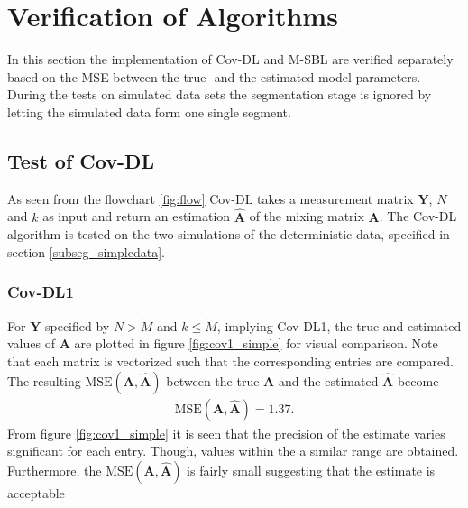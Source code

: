 \section{Verification of Algorithms}
In this section the implementation of Cov-DL and M-SBL are verified separately based on the MSE between the true- and the estimated model parameters.
During the tests on simulated data sets the segmentation stage is ignored by letting the simulated data form one single segment.    

\subsection{Test of Cov-DL}
As seen from the flowchart \ref{fig:flow} Cov-DL takes a measurement matrix $\mathbf{Y}$, $N$ and $k$ as input and return an estimation $\hat{\mathbf{A}}$ of the mixing matrix $\mathbf{A}$. 
The Cov-DL algorithm is tested on the two simulations of the deterministic data, specified in section \ref{subseg_simpledata}. 

\subsubsection{Cov-DL1}
For $\mathbf{Y}$ specified by $N > \widetilde{M}$ and $k \leq \widetilde{M}$, implying Cov-DL1, the true and estimated values of $\mathbf{A}$ are plotted in figure \ref{fig:cov1_simple} for visual comparison. 
Note that each matrix is vectorized such that the corresponding entries are compared.  
The resulting $\text{MSE}(\mathbf{A}, \hat{\mathbf{A}})$ between the true $\mathbf{A}$ and the estimated $\hat{\mathbf{A}}$ become 
\begin{align*}
\text{MSE}(\mathbf{A}, \hat{\mathbf{A}}) = 1.37.
\end{align*}
From figure \ref{fig:cov1_simple} it is seen that the precision of the estimate varies significant for each entry. 
Though, values within the a similar range are obtained.
Furthermore, the $\text{MSE}(\mathbf{A}, \hat{\mathbf{A}})$ is fairly small suggesting that the estimate is acceptable  

